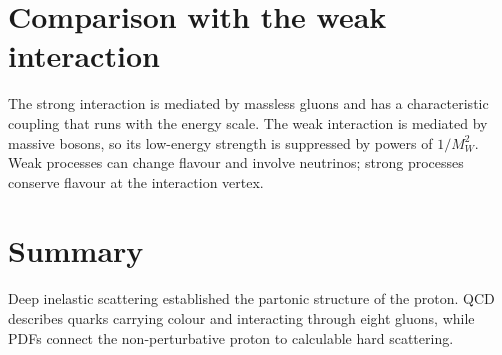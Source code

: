 \documentclass[11pt,a4paper]{article}
\begin{document}
\section{Comparison with the weak interaction}
The strong interaction is mediated by massless gluons and has a characteristic coupling that runs with the energy scale. The weak interaction is mediated by massive bosons, so its low-energy strength is suppressed by powers of $1/M_W^2$. Weak processes can change flavour and involve neutrinos; strong processes conserve flavour at the interaction vertex.

\section*{Summary}
Deep inelastic scattering established the partonic structure of the proton. QCD describes quarks carrying colour and interacting through eight gluons, while PDFs connect the non-perturbative proton to calculable hard scattering.
\end{document}
